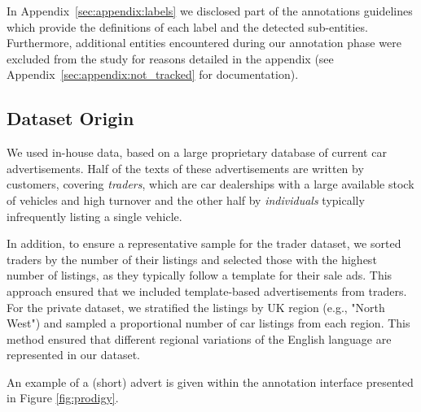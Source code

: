 \documentclass[11pt]{article}
\begin{document}



\noindent

In Appendix~\ref{sec:appendix:labels} we disclosed part of the annotations guidelines which provide the definitions of each label and the detected sub-entities. Furthermore, additional entities encountered during our annotation phase were excluded from the study for reasons detailed in the appendix (see Appendix~\ref{sec:appendix:not_tracked} for documentation).


\label{sec:prel}
\subsection{Dataset Origin}

We used in-house data, based on a large proprietary database of current car advertisements. Half of the texts of these advertisements are written by customers, covering \textit{traders}, which are car dealerships with a large available stock of vehicles and high turnover and the other half by \textit{individuals} typically infrequently listing a single vehicle. 





In addition, to ensure a representative sample for the trader dataset, we sorted traders by the number of their listings and selected those with the highest number of listings, as they typically follow a template for their sale ads. This approach ensured that we included template-based advertisements from traders. For the private dataset, we stratified the listings by UK region (e.g., "North West") and sampled a proportional number of car listings from each region. This method ensured that different regional variations of the English language are represented in our dataset.

An example of a (short) advert is given within the annotation interface presented in Figure \ref{fig:prodigy}.

\end{document}
